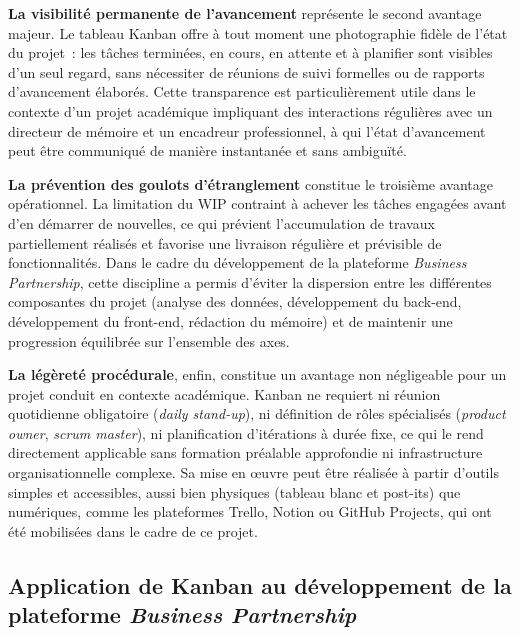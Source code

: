 \textbf{La visibilité permanente de l'avancement} représente le
second avantage majeur. Le tableau Kanban offre à tout moment une
photographie fidèle de l'état du projet~: les tâches terminées, en
cours, en attente et à planifier sont visibles d'un seul regard,
sans nécessiter de réunions de suivi formelles ou de rapports
d'avancement élaborés. Cette transparence est particulièrement utile
dans le contexte d'un projet académique impliquant des interactions
régulières avec un directeur de mémoire et un encadreur professionnel,
à qui l'état d'avancement peut être communiqué de manière instantanée
et sans ambiguïté.

\textbf{La prévention des goulots d'étranglement} constitue le
troisième avantage opérationnel. La limitation du WIP contraint à
achever les tâches engagées avant d'en démarrer de nouvelles, ce
qui prévient l'accumulation de travaux partiellement réalisés et
favorise une livraison régulière et prévisible de fonctionnalités.
Dans le cadre du développement de la plateforme \textit{Business
	Partnership}, cette discipline a permis d'éviter la dispersion entre
les différentes composantes du projet (analyse des données,
développement du back-end, développement du front-end, rédaction du
mémoire) et de maintenir une progression équilibrée sur l'ensemble
des axes.

\textbf{La légèreté procédurale}, enfin, constitue un avantage
non négligeable pour un projet conduit en contexte académique. Kanban
ne requiert ni réunion quotidienne obligatoire (\textit{daily
	stand-up}), ni définition de rôles spécialisés (\textit{product
	owner}, \textit{scrum master}), ni planification d'itérations à
durée fixe, ce qui le rend directement applicable sans formation
préalable approfondie ni infrastructure organisationnelle complexe.
Sa mise en \oe uvre peut être réalisée à partir d'outils simples et
accessibles, aussi bien physiques (tableau blanc et post-its) que
numériques, comme les plateformes Trello, Notion ou GitHub Projects,
qui ont été mobilisées dans le cadre de ce projet.

\subsection{Application de Kanban au développement de la plateforme
	\textit{Business Partnership}}
\label{subsec:kanban_application}

